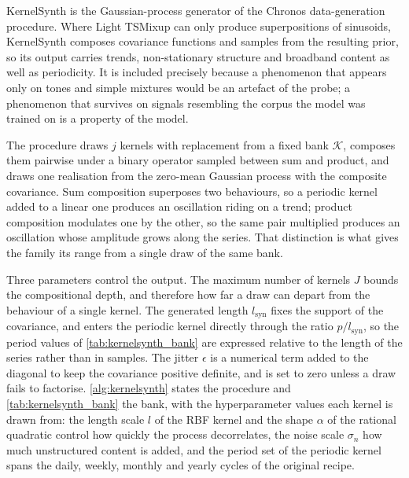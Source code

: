 

\medskip

KernelSynth is the Gaussian-process generator of the Chronos data-generation procedure\autocite{ansariChronosLearningLanguage2024}. Where Light TSMixup can only produce superpositions of sinusoids, KernelSynth composes covariance functions and samples from the resulting prior, so its output carries trends, non-stationary structure and broadband content as well as periodicity. It is included precisely because a phenomenon that appears only on tones and simple mixtures would be an artefact of the probe; a phenomenon that survives on signals resembling the corpus the model was trained on is a property of the model.

The procedure draws $j$ kernels with replacement from a fixed bank $\mathcal K$, composes them pairwise under a binary operator sampled between sum and product, and draws one realisation from the zero-mean Gaussian process with the composite covariance. Sum composition superposes two behaviours, so a periodic kernel added to a linear one produces an oscillation riding on a trend; product composition modulates one by the other, so the same pair multiplied produces an oscillation whose amplitude grows along the series. That distinction is what gives the family its range from a single draw of the same bank.

Three parameters control the output. The maximum number of kernels $J$ bounds the compositional depth, and therefore how far a draw can depart from the behaviour of a single kernel. The generated length $l_{\mathrm{syn}}$ fixes the support of the covariance, and enters the periodic kernel directly through the ratio $p/l_{\mathrm{syn}}$, so the period values of \autoref{tab:kernelsynth_bank} are expressed relative to the length of the series rather than in samples. The jitter $\epsilon$ is a numerical term added to the diagonal to keep the covariance positive definite, and is set to zero unless a draw fails to factorise. \autoref{alg:kernelsynth} states the procedure and \autoref{tab:kernelsynth_bank} the bank, with the hyperparameter values each kernel is drawn from: the length scale $l$ of the RBF kernel and the shape $\alpha$ of the rational quadratic control how quickly the process decorrelates, the noise scale $\sigma_n$ how much unstructured content is added, and the period set of the periodic kernel spans the daily, weekly, monthly and yearly cycles of the original recipe.




